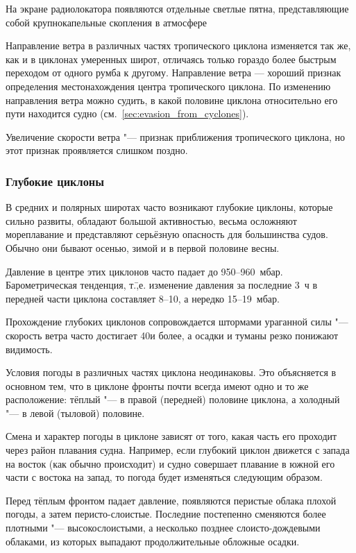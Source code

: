  На экране радиолокатора появляются отдельные светлые пятна,
представляющие собой крупнокапельные скопления в атмосфере

 Направление ветра в различных частях тропического циклона
изменяется так же, как и в циклонах умеренных широт, отличаясь только
гораздо более быстрым переходом от одного румба к другому. Направление
ветра — хороший признак определения местонахождения центра
тропического циклона. По изменению направления ветра можно судить, в
какой половине циклона относительно его пути находится судно
(см.~\ref{sec:evasion_from_cyclones}).

 Увеличение скорости ветра "--- признак приближения тропического
циклона, но этот признак проявляется слишком поздно.

\subsubsection{Глубокие циклоны}

В средних и полярных широтах часто возникают глубокие циклоны, которые
сильно развиты, обладают большой активностью, весьма осложняют
мореплавание и представляют серьёзную опасность для большинства
судов. Обычно они бывают осенью, зимой и в первой половине весны.

Давление в центре этих циклонов часто падает до 950--960~мбар.
Барометрическая тенденция, т.\=,е. изменение давления за
последние 3~ч в передней части циклона составляет 8--10, а нередко
15--19~мбар.

Прохождение глубоких циклонов сопровождается штормами ураганной силы "---
скорость ветра часто достигает 40\speedms и более, а осадки и туманы
резко понижают видимость.

Условия погоды в различных частях циклона неодинаковы. Это объясняется
в основном тем, что в циклоне фронты почти всегда имеют одно и то же
расположение: тёплый "--- в правой (передней) половине циклона, а
холодный "--- в левой (тыловой) половине.

Смена и характер погоды в циклоне зависят от того, какая часть его
проходит через район плавания судна. Например, если глубокий циклон
движется с запада на восток (как обычно происходит) и судно совершает
плавание в южной его части с востока на запад, то погода будет
изменяться следующим образом.

Перед тёплым фронтом падает давление, появляются перистые облака
плохой погоды, а затем перисто-слоистые. Последние постепенно
сменяются более плотными "--- высокослоистыми, а несколько позднее
слоисто-дождевыми облаками, из которых выпадают продолжительные
обложные осадки.

